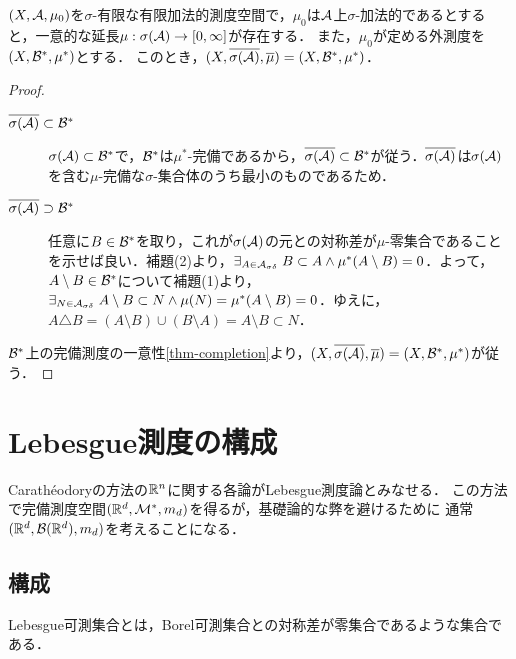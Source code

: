 \documentclass[uplatex, dvipdfmx]{jsreport}
\begin{document}
\begin{theorem}[完備化]\label{thm-complesion-and-extension}
    $(X,\mathcal{A},\mu_0)$を$\sigma$-有限な有限加法的測度空間で，$\mu_0$は$\mathcal{A}$上$\sigma$-加法的であるとすると，一意的な延長$\mu:\sigma(\mathcal{A})\to[0,\infty]$が存在する．
    また，$\mu_0$が定める外測度を$(X,\mathcal{B}^*,\mu^*)$とする．
    このとき，$(X,\overline{\sigma(\mathcal{A})},\overline{\mu})=(X,\mathcal{B}^*,\mu^*)$．
\end{theorem}
\begin{proof}\mbox{}
    \begin{description}
        \item[$\overline{\sigma(\mathcal{A})}\subset\mathcal{B}^*$] $\sigma(\mathcal{A})\subset\mathcal{B}^*$で，$\mathcal{B}^*$は$\mu^*$-完備であるから，$\overline{\sigma(\mathcal{A})}\subset\mathcal{B}^*$が従う．$\overline{\sigma(\mathcal{A})}$は$\sigma(\mathcal{A})$を含む$\mu$-完備な$\sigma$-集合体のうち最小のものであるため．
        \item[$\overline{\sigma(\mathcal{A})}\supset\mathcal{B}^*$] 任意に$B\in\mathcal{B}^*$を取り，これが$\sigma(\mathcal{A})$の元との対称差が$\mu$-零集合であることを示せば良い．補題(2)より，$\exists_{A\in\mathcal{A}_{\sigma\delta}}\;B\subset A\land \mu^*(A\setminus B)=0$．よって，$A\setminus B\in\mathcal{B}^*$について補題(1)より，$\exists_{N\in\mathcal{A}_{\sigma\delta}}\;A\setminus B\subset N\land \mu(N)=\mu^*(A\setminus B)=0$．ゆえに，$A\triangle B=(A\setminus B)\cup(B\setminus A)=A\setminus B\subset N$．
    \end{description}
    $\mathcal{B}^*$上の完備測度の一意性\ref{thm-completion}より，$(X,\overline{\sigma(\mathcal{A})},\overline{\mu})=(X,\mathcal{B}^*,\mu^*)$が従う．
\end{proof}


\section{Lebesgue測度の構成}

\begin{tcolorbox}[colframe=ForestGreen, colback=ForestGreen!10!white,breakable,colbacktitle=ForestGreen!40!white,coltitle=black,fonttitle=\bfseries\sffamily,
title=]
    Carathéodoryの方法の$\mathbb{R}^n$に関する各論がLebesgue測度論とみなせる．
    この方法で完備測度空間$(\mathbb{R}^d,\mathcal{M}^*,m_d)$を得るが，基礎論的な弊を避けるために
    通常$(\mathbb{R}^d,\mathcal{B}(\mathbb{R}^d),m_d)$を考えることになる．
\end{tcolorbox}

\subsection{構成}

\begin{tcolorbox}[colframe=ForestGreen, colback=ForestGreen!10!white,breakable,colbacktitle=ForestGreen!40!white,coltitle=black,fonttitle=\bfseries\sffamily,
title=]
    Lebesgue可測集合とは，Borel可測集合との対称差が零集合であるような集合である．
\end{tcolorbox}
\end{document}

